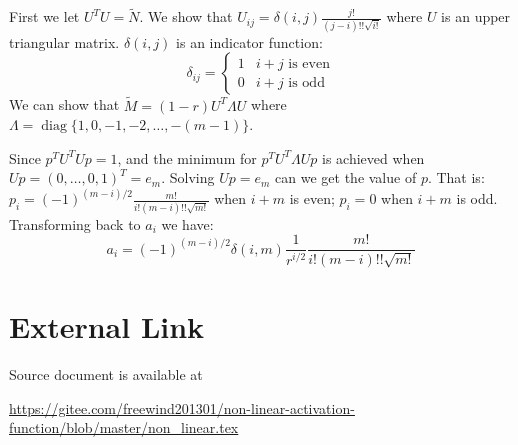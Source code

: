 \documentclass{article}
\DeclareMathOperator*{\diag}{diag}
\begin{document}
First we let $U^T U = \widetilde{N}$. We show that $U_{ij} = \delta(i,j)\frac{j!}{(j-i)!!\sqrt{i!}}$ where $U$ is an upper triangular matrix. $\delta(i,j)$ is an indicator function:
\begin{equation}
\delta_{ij} = \begin{cases}
1 & i+j \textrm{ is even} \\
0 & i+j \textrm{ is odd}
\end{cases}
\end{equation}
We can show that $\widetilde{M} = (1-r)U^T \Lambda U$ where $\Lambda = \diag\{1,0, -1, -2, \dots, -(m-1)\}$.

Since $p^T U^T U p = 1$, and the minimum for $p^T U^T \Lambda U p $ is achieved when $U p = (0, \dots, 0, 1)^T = e_m$. Solving $ U p = e_m $ can we get the value of $p$. That is: $p_i = (-1)^{(m-i)/2} \frac{m!}{i!(m-i)!! \sqrt{m!}} $ when $i+m$ is even; $p_i = 0 $ when $i+m$ is odd. Transforming back to $a_i$ we have:
\begin{equation}
a_i =(-1)^{(m-i)/2} \delta(i,m) \frac{1}{r^{i/2}} \frac{m!}{i!(m-i)!! \sqrt{m!}}
\end{equation}
\section{External Link}
Source document is available at 

\url{https://gitee.com/freewind201301/non-linear-activation-function/blob/master/non_linear.tex}
\end{document}
